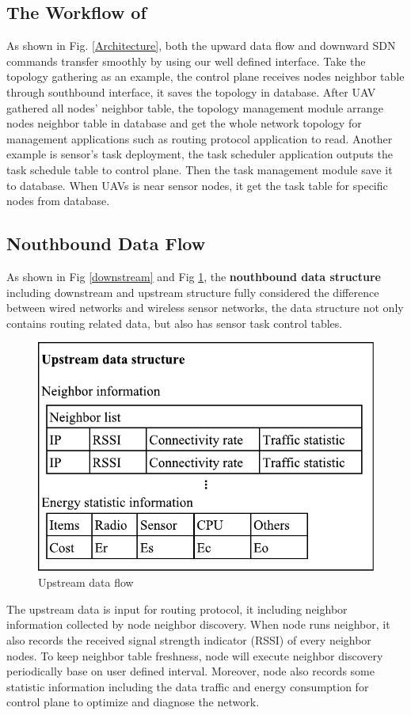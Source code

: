 \subsection{The Workflow of {\sdn}}
As shown in Fig. \ref{Architecture}, both the upward data flow and downward SDN commands transfer smoothly by using our well defined interface. Take the topology gathering as an example, the control plane receives nodes neighbor table through southbound interface, it saves the topology in database. After UAV gathered all nodes' neighbor table, the topology management module arrange nodes neighbor table in database and get the whole network topology for management applications such as routing protocol application to read. Another example is sensor's task deployment, the task scheduler application outputs the task schedule table to control plane. Then the task management module save it to database. When UAVs is near sensor nodes, it get the task table for specific nodes from database. 


\subsection{Nouthbound Data Flow}

As shown in Fig \ref{downstream} and Fig \ref{upstream}, the \textbf{nouthbound data structure} including downstream and upstream structure fully considered the difference between wired networks and wireless sensor networks, the data structure not only contains routing  related data, but also has sensor task control tables.

\begin{figure}[htbp]
	\centering
	\includegraphics[width=.7\columnwidth]{Figure/upstream}
	\caption{Upstream data flow}
	\label{upstream}
\end{figure}

The upstream data is input for routing protocol, it including neighbor information collected by node neighbor discovery. 
When node runs neighbor, it also records the received signal strength indicator (RSSI) of every neighbor nodes. To keep neighbor table freshness, 
node will execute neighbor discovery periodically base on user defined interval.
Moreover, node also records some statistic information including the data traffic and energy consumption for control plane to optimize and diagnose the network.

